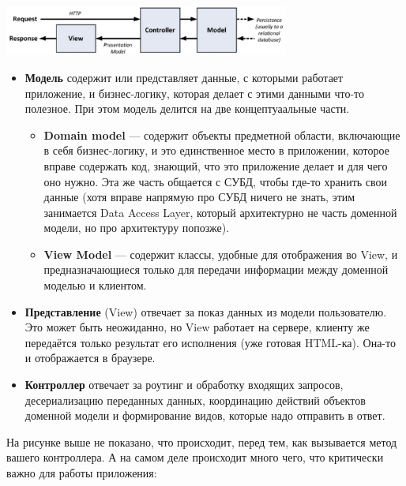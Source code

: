 \documentclass{../../text-style}
\begin{document}
\pagebreak

\begin{center}
    \includegraphics[width=0.7\textwidth]{mvc.png}
\end{center}

\begin{itemize}
    \item \textbf{Модель} содержит или представляет данные, с которыми работает приложение, и бизнес-логику, которая делает с этими данными что-то полезное. При этом модель делится на две концептуаальные части.
    \begin{itemize}
        \item \textbf{Domain model} --- содержит объекты предметной области, включающие в себя бизнес-логику, и это единственное место в приложении, которое вправе содержать код, знающий, что это приложение делает и для чего оно нужно. Эта же часть общается с СУБД, чтобы где-то хранить свои данные (хотя вправе напрямую про СУБД ничего не знать, этим занимается Data Access Layer, который архитектурно не часть доменной модели, но про архитектуру попозже).
        \item \textbf{View Model} --- содержит классы, удобные для отображения во View, и предназначающиеся только для передачи информации между доменной моделью и клиентом.
    \end{itemize}
    \item \textbf{Представление} (View) отвечает за показ данных из модели пользователю. Это может быть неожиданно, но View работает на сервере, клиенту же передаётся только результат его исполнения (уже готовая HTML-ка). Она-то и отображается в браузере.
    \item \textbf{Контроллер} отвечает за роутинг и обработку входящих запросов, десериализацию переданных данных, координацию действий объектов доменной модели и формирование видов, которые надо отправить в ответ.
\end{itemize}

На рисунке выше не показано, что происходит, перед тем, как вызывается метод вашего контроллера. А на самом деле происходит много чего, что критически важно для работы приложения:
\end{document}
